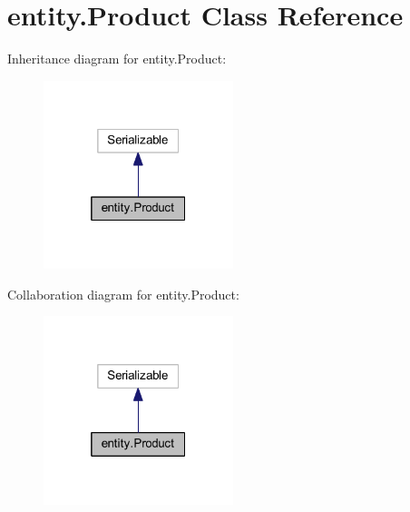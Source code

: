 \hypertarget{classentity_1_1_product}{}\section{entity.\+Product Class Reference}
\label{classentity_1_1_product}


Inheritance diagram for entity.\+Product\+:\nopagebreak
\begin{figure}[H]
\begin{center}
\leavevmode
\includegraphics[width=157pt]{classentity_1_1_product__inherit__graph}
\end{center}
\end{figure}


Collaboration diagram for entity.\+Product\+:\nopagebreak
\begin{figure}[H]
\begin{center}
\leavevmode
\includegraphics[width=157pt]{classentity_1_1_product__coll__graph}
\end{center}
\end{figure}
